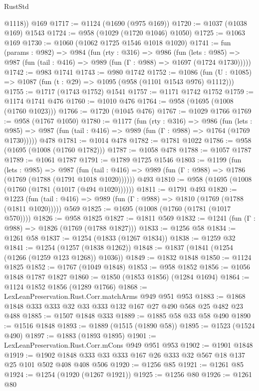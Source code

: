 \begin{lexlean}{RustStd}
\begin{coremodule}
        @1118))
    @169
@1717 := @1124 (@1690 (@975 @169))
@1720 := @1037 (@1038 @169) @1543
@1724 := @958 (@1029 (@1720 @1046) @1050)
@1725 := @1063 @169
@1730 := @1060 (@1062 @1725 @1546 @1018 @1020)
@1741 := fun (params : @982) =>
  @984
    (fun (rty : @316) =>
    @986
      (fun (lets : @985) =>
      @987 (fun (tail : @416) => @989 (fun (Γ : @988) => @1697 (@1724 @1730)))))
@1742 := @983 @1741
@1743 := @980 @1742
@1752 := @1086 (fun (U : @1085) => @1087 (fun (t : @29) => @1095 (@958 (@1101 @1543 @976) @1112)))
@1755 := @1717 (@1743 @1752) @1541
@1757 := @1171 @1742 @1752
@1759 := @1174 @1741 @476
@1760 := @1010 @476
@1764 := @958 (@1695 (@1008 (@1760 @1023)))
@1766 := @1720 (@1045 @476)
@1767 := @1029 @1766
@1769 := @958 (@1767 @1050)
@1780 := @1177
    (fun (rty : @316) =>
    @986
      (fun (lets : @985) =>
      @987 (fun (tail : @416) => @989 (fun (Γ : @988) => @1764 (@1769 @1730)))))
    @478
@1781 := @1014 @478
@1782 := @1781 @1022
@1786 := @958 (@1695 (@1008 (@1760 @1782)))
@1787 := @1058 @478
@1788 := @1057 @1787
@1789 := @1061 @1787
@1791 := @1789 @1725 @1546
@1803 := @1199
    (fun (lets : @985) =>
    @987 (fun (tail : @416) => @989 (fun (Γ : @988) => @1786 (@1769 (@1788 (@1791 @1018 @1020))))))
    @493
@1810 := @958 (@1695 (@1008 (@1760 (@1781 (@1017 (@494 @1020))))))
@1811 := @1791 @493
@1820 := @1223
    (fun (tail : @416) => @989 (fun (Γ : @988) => @1810 (@1769 (@1788 (@1811 @1020)))))
    @569
@1825 := @1695 (@1008 (@1760 (@1781 (@1017 @570))))
@1826 := @958 @1825
@1827 := @1811 @569
@1832 := @1241 (fun (Γ : @988) => @1826 (@1769 (@1788 @1827)))
@1833 := @1256 @58
@1834 := @1261 @58
@1837 := @1254 (@1833 (@1267 @1834))
@1838 := @1259 @32
@1841 := @1254 (@1257 (@1838 @1262))
@1848 := @1837 (@1841 (@1254 (@1266 (@1259 @123 @1268)) @1036))
@1849 := @1832 @1848
@1850 := @1124 @1825
@1852 := @1767 (@1049 @1848)
@1853 := @958 @1852
@1856 := @1056 @1848 @1787 @1827
@1860 := @1850 (@1853 @1856) (@1284 @1694)
@1864 := @1124 @1852 @1856 (@1289 @1766)
@1868 := LexLeanPreservation.Rust.Corr.matchArms @949 @951 @953
@1883 := @1868 @1848 @333 @333 @32 @33 @333 @132 @167 @27 @490 @568 @25 @482 @23 @488
@1885 := @1507 @1848 @333
@1889 := @1885 @58 @33 @58 @490
@1890 := @1516 @1848
@1893 := @1889 (@1515 (@1890 @58))
@1895 := @1523 (@1524 @490)
@1897 := @1883 (@1893 @1895)
@1901 := LexLeanPreservation.Rust.Corr.mCons @949 @951 @953
@1902 := @1901 @1848
@1919 := @1902 @1848 @333 @33 @333 @167 @26 @333 @32 @567 @18 @137 @25 @101 @502 @408 @408 @506
@1920 := @1256 @85
@1921 := @1261 @85
@1924 := @1254 (@1920 (@1267 @1921))
@1925 := @1256 @80
@1926 := @1261 @80

\end{coremodule}
\end{lexlean}
